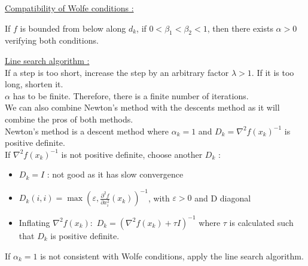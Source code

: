 \documentclass[../main.tex]{subfiles}
\begin{document}
\quad \underline{Compatibility of Wolfe conditions :}\\
\begin{theoremen}
    If $f$ is bounded from below along $d_k$, if $0<\beta_1<\beta_2<1$, then there exists $\alpha>0$ verifying both conditions.\\
\end{theoremen}

\quad \underline{Line search algorithm :}\\

If a step is too short, increase the step by an arbitrary factor $\lambda>1$. If it is too long, shorten it.\\
$\alpha$ has to be finite. Therefore, there is a finite number of iterations. \\

We can also combine Newton's method with the descents method as it will combine the pros of both methods.\\

Newton's method is a descent method where $\alpha_k = 1$ and $D_k = \nabla^2 f(x_k)^{-1}$ is positive definite.\\

If $\nabla^2 f(x_k)^{-1}$ is not positive definite, choose another $D_k$ : \begin{itemize}
    \item $D_k = I$ : not good as it has slow convergence\\
    \item $D_k(i,i)=\max(\varepsilon, \frac{\partial^2 f}{\partial x_i^2}(x_k))^{-1}$, with $\varepsilon>0$ and D diagonal\\
    \item Inflating $\nabla^2 f(x_k) : $ $D_k = (\nabla^2f(x_k) + \tau I)^{-1}$ where $\tau$ is calculated such that $D_k$ is positive definite.\\
\end{itemize}

If $\alpha_k = 1$ is not consistent with Wolfe conditions, apply the line search algorithm.\\
\end{document}
